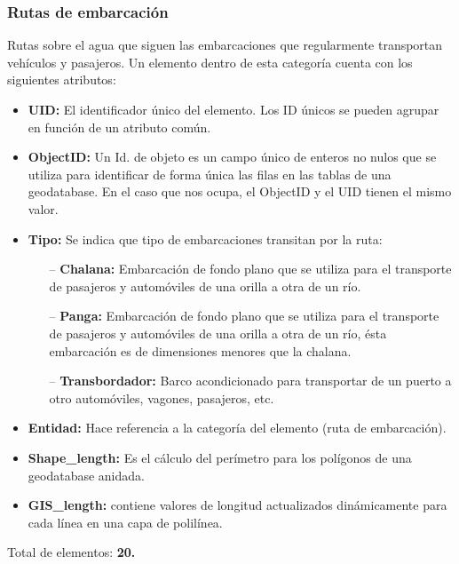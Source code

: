 \documentclass[10pt,letterpaper]{article}
\newcommand{\descripcion}{Un elemento dentro de esta categor\'ia cuenta con los siguientes atributos:}
\newcommand{\total}{Total de elementos: }
\newcommand{\UID}{\textbf{UID:} El identificador \'unico del elemento. Los ID \'unicos se pueden agrupar en funci\'on de un atributo com\'un.}
\newcommand{\OID}{\textbf{ObjectID:} Un Id. de objeto es un campo \'unico de enteros no nulos que se utiliza para identificar de forma \'unica las filas en las tablas de una geodatabase. En el caso que nos ocupa, el ObjectID y el UID tienen el mismo valor.}
\newcommand{\ent}{\textbf{Entidad:} Hace referencia a la categor\'ia del elemento }
\newcommand{\SHL}{\textbf{Shape\_length:} Es el c\'alculo del per\'imetro para los pol\'igonos de una geodatabase anidada.}
\newcommand{\GISL}{\textbf{GIS\_length:} contiene valores de longitud actualizados din\'amicamente para cada l\'inea en una capa de polil\'inea.}
\begin{document}
\subsubsection{Rutas de embarcaci\'on}
Rutas sobre el agua que siguen las embarcaciones que regularmente transportan veh\'iculos y pasajeros. \descripcion
\begin{itemize}
	\item \UID
	\item \OID
	\item \textbf{Tipo:} Se indica que tipo de embarcaciones transitan por la ruta:
	\begin{itemize}
		\item[--] \textbf{Chalana:} Embarcaci\'on de fondo plano que se utiliza para el transporte de pasajeros y autom\'oviles de una orilla a otra de un r\'io.
		\item[--] \textbf{Panga:} Embarcaci\'on de fondo plano que se utiliza para el transporte de pasajeros y autom\'oviles de una orilla a otra de un r\'io, \'esta embarcaci\'on es de dimensiones menores que la chalana.
		\item[--] \textbf{Transbordador:} Barco acondicionado para transportar de un puerto a otro autom\'oviles, vagones, pasajeros, etc. 
	\end{itemize}
	\item \ent (ruta de embarcaci\'on).
	\item \SHL
	\item \GISL
\end{itemize}
\total \textbf{20.}

\end{document}
